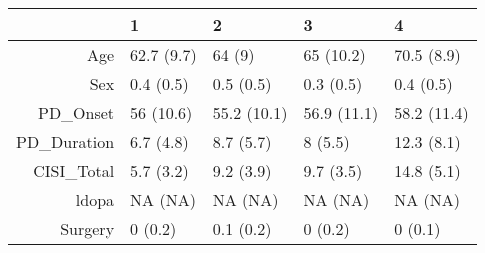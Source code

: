 \begin{table}[ht]
\centering
\begin{tabular}{rllll}
  \toprule
 & 1 & 2 & 3 & 4 \\ 
  \midrule
Age & 62.7 (9.7) & 64 (9) & 65 (10.2) & 70.5 (8.9) \\ 
  Sex & 0.4 (0.5) & 0.5 (0.5) & 0.3 (0.5) & 0.4 (0.5) \\ 
  PD\_Onset & 56 (10.6) & 55.2 (10.1) & 56.9 (11.1) & 58.2 (11.4) \\ 
  PD\_Duration & 6.7 (4.8) & 8.7 (5.7) & 8 (5.5) & 12.3 (8.1) \\ 
  CISI\_Total & 5.7 (3.2) & 9.2 (3.9) & 9.7 (3.5) & 14.8 (5.1) \\ 
  ldopa & NA (NA) & NA (NA) & NA (NA) & NA (NA) \\ 
  Surgery & 0 (0.2) & 0.1 (0.2) & 0 (0.2) & 0 (0.1) \\ 
   \bottomrule
\end{tabular}
\end{table}
